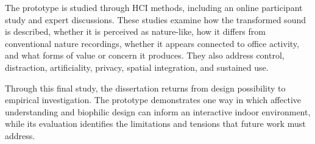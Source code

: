 The prototype is studied through HCI methods, including an online participant study and expert discussions. These studies examine how the transformed sound is described, whether it is perceived as nature-like, how it differs from conventional nature recordings, whether it appears connected to office activity, and what forms of value or concern it produces. They also address control, distraction, artificiality, privacy, spatial integration, and sustained use.

Through this final study, the dissertation returns from design possibility to empirical investigation. The prototype demonstrates one way in which affective understanding and biophilic design can inform an interactive indoor environment, while its evaluation identifies the limitations and tensions that future work must address.